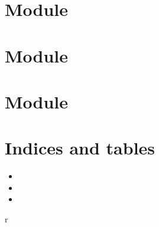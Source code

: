 \documentclass[letterpaper,10pt,english]{sphinxmanual}
\begin{document}
\chapter{Module }
\label{\detokenize{index:module-rcpy-encoder}}\label{\detokenize{index:rcpy-encoder}}

\chapter{Module }
\label{\detokenize{index:module-rcpy-mpu9250}}\label{\detokenize{index:rcpy-mpy9250}}

\chapter{Module }
\label{\detokenize{index:rcpy-motor}}\label{\detokenize{index:module-rcpy-motor}}

\chapter{Indices and tables}
\label{\detokenize{index:indices-and-tables}}\begin{itemize}
\item {} 

\item {} 

\item {} 

\end{itemize}


\renewcommand{\indexname}{Python Module Index}
\begin{sphinxtheindex}
\def\bigletter#1{{\Large\sffamily#1}\nopagebreak\vspace{1mm}}
\bigletter{r}
\item {}
\item {}
\item {}
\item {}
\end{sphinxtheindex}

\renewcommand{\indexname}{Index}
\printindex
\end{document}
